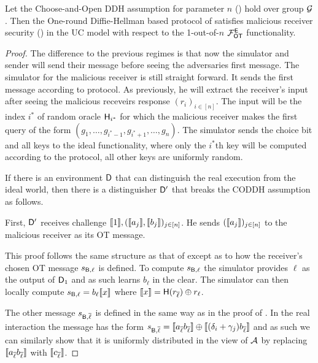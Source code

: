 \begin{lemma}
	Let the Choose-and-Open DDH assumption for parameter $n$ () hold over group $\mathcal{G}$. Then the One-round Diffie-Hellman based protocol  of  satisfies malicious receiver security () in the UC model with respect to the 1-out-of-$n$ $\mathcal{F}_{\mathsf{OT}}^\mathsf{E}$ functionality.
\end{lemma}
\begin{proof}
The difference to the previous regimes is that now the simulator and sender will send their message before seeing the adversaries first message. The simulator for the malicious receiver is still straight forward. It sends the first message according to protocol. As previously, he will extract the receiver's input after seeing the malicious receveirs response $(r_i)_{i\in [n]}$. The input will be the index $i^*$ of random oracle $\mathsf{H}_{i^*}$ for which the malicious receiver makes the first query of the form $(g_1,\ldots,g_{i^*-1},g_{i^*+1},\ldots,g_n)$. The simulator sends the choice bit and all keys to the ideal functionality, where only the $i^*$th key will be computed according to the protocol, all other keys are uniformly random. 

If there is an environment $\mathsf D$ that can distinguish the real execution from the ideal world, then there is a distinguisher $\mathsf D'$ that breaks the CODDH assumption as follows. 

First, $\mathsf D'$ receives challenge $\llbracket 1\rrbracket, (\llbracket a_j\rrbracket,\llbracket b_j\rrbracket)_{j\in [n]}$. He sends $(\llbracket a_j\rrbracket)_{j\in [n]}$ to the malicious receiver as its OT message. 



	This proof follows the same structure as that of  except as to how the receiver's chosen OT message $s_{\mathsf{B}, \ell}$ is defined. To compute $s_{\mathsf{B}, \ell}$ the simulator provides $\ell$ as the output of $\mathsf D_1$ and as such learns $b_\ell$ in the clear. The simulator can then locally compute $s_{\mathsf{B}, \ell}=b_\ell\llbracket x\rrbracket$ where $\llbracket x\rrbracket=\mathsf{H}(r_{\overline \ell})\oplus r_\ell$. 
	
	The other message $s_{\mathsf{B},\overline \ell}$ is defined in the same way as in the proof of . In the real interaction the message has the form $s_{\mathsf{B},{\overline \ell}}=\llbracket a_{\overline{\ell}}b_{\overline{\ell}}\rrbracket \oplus \llbracket{(\delta_i+\gamma_j)b_{\overline{\ell}}}\rrbracket$ and as such we can similarly show that it is uniformly distributed in the view of $\mathcal{A}$ by replacing $\llbracket a_{\overline{\ell}}b_{\overline{\ell}}\rrbracket$ with $\llbracket c_{\overline{\ell}}\rrbracket$.
\end{proof}

